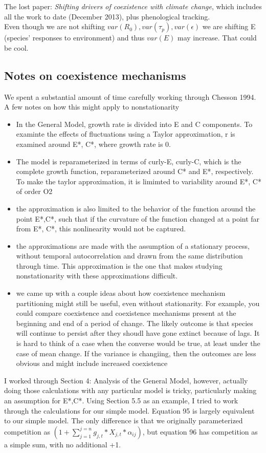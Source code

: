 \documentclass[11pt,a4paper,oneside]{article}
\begin{document}
\noindet The lost paper: \emph{Shifting drivers of coexistence with climate change}, which includes all the work to date (December 2013), plus phenological tracking.\\

 Even though we are not shifting \(var(R_{0}), var(\tau_{p}), var(\epsilon)\) we are shifting E (species' responses to environment) and thus \(var(E)\) may increase. That could be cool.\\

\subsection{Notes on coexistence mechanisms}
We spent a substantial amount of time carefully working through Chesson 1994.  A few notes on how this might apply to nonstationarity
\begin{itemize}
\item In the General Model, growth rate is divided into E and C components.  To examinte the effects of fluctuations using a Taylor approximation, r is examined around E*, C*, where growth rate is 0.  
\item  The model is reparameterized in terms of curly-E, curly-C, which is the complete growth function, reparameterized around C* and E*, respectively.  To make the taylor approximation, it is limimted to variability around E*, C* of order O2
\item the approximation is also limited to the behavior of the function around the point E*,C*, such that if the curvature of the function changed at a point far from E*, C*, this nonlinearity would not be captured.
\item  the approximations are made with the assumption of a stationary process, without temporal autocorrelation and drawn from the same distribution through time.  This approximation is the one that makes studying nonstationarity with these approximations difficult. 
\item  we came up with a couple ideas about how coexistence mechanism partitioning might still be useful, even without stationarity.  For example, you could compare coexistence and coexistence mechanisms present at the beginning and end of a period of change.  The likely outcome is that species will continue to persist after they shoudl have gone extinct because of lags.  It is hard to think of a case when the converse would be true, at least under the case of mean change.  If the variance is changiing, then the outcomes are less obvious and might include increased coexistence
\end{itemize}
I worked through Section 4: Analysis of the General Model, however, actually doing those calculations with any particular model is tricky, particularly making an assumption for E*,C*.  Using Section 5.5 as an example, I tried to work through the calculations for our simple model.  Equation 95 is largely equivalent to our simple model. The only difference is that we originally parameterized competition as $(1+ \sum\limits_{j=1}^{j=n}g_{j,t}*X_{j,t}*\alpha_{ij})$, but equation 96 has competition as a simple sum, with no additional +1. %
\end{document}
